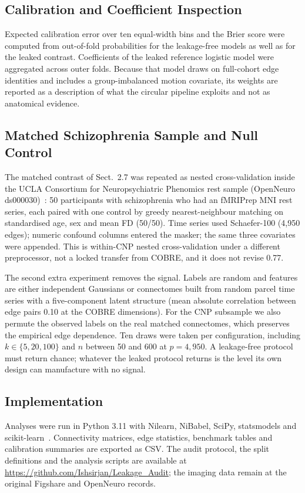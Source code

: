 \documentclass[runningheads]{llncs}
\begin{document}
\subsection{Calibration and Coefficient Inspection}
Expected calibration error over ten equal-width bins and the Brier score were computed
from out-of-fold probabilities for the leakage-free models as well as for the leaked
contrast. Coefficients of the leaked reference logistic model were aggregated across
outer folds. Because that model draws on full-cohort edge identities and includes a
group-imbalanced motion covariate, its weights are reported as a description of what the
circular pipeline exploits and not as anatomical evidence.

\subsection{Matched Schizophrenia Sample and Null Control}
The matched contrast of Sect.~2.7 was repeated as nested cross-validation inside the
UCLA Consortium for Neuropsychiatric Phenomics rest sample (OpenNeuro
ds000030)~\cite{Poldrack2016}: 50 participants with schizophrenia who had an fMRIPrep MNI
rest series, each paired with one control by greedy nearest-neighbour matching on
standardised age, sex and mean FD (50/50). Time series used Schaefer-100 (4,950 edges);
numeric confound columns entered the masker; the same three covariates were appended.
This is within-CNP nested cross-validation under a different preprocessor, not a locked
transfer from COBRE, and it does not revise 0.77.

The second extra experiment removes the signal. Labels are random and features are
either independent Gaussians or connectomes built from random parcel time series with a
five-component latent structure (mean absolute correlation between edge pairs 0.10 at
the COBRE dimensions). For the CNP subsample we also permute the observed labels on the
real matched connectomes, which preserves the empirical edge dependence. Ten draws were
taken per configuration, including $k \in \{5, 20, 100\}$ and $n$ between 50 and 600 at
$p = 4{,}950$. A leakage-free protocol must return chance; whatever the leaked protocol
returns is the level its own design can manufacture with no signal.

\subsection{Implementation}
Analyses were run in Python 3.11 with Nilearn, NiBabel, SciPy, statsmodels and
scikit-learn~\cite{Abraham2014,Pedregosa2011}. Connectivity matrices, edge statistics,
benchmark tables and calibration summaries are exported as CSV. The audit protocol, the
split definitions and the analysis scripts are available at
\url{https://github.com/Ishsirjan/Leakage_Audit}; the imaging data remain at the original
Figshare and OpenNeuro records.
\end{document}
